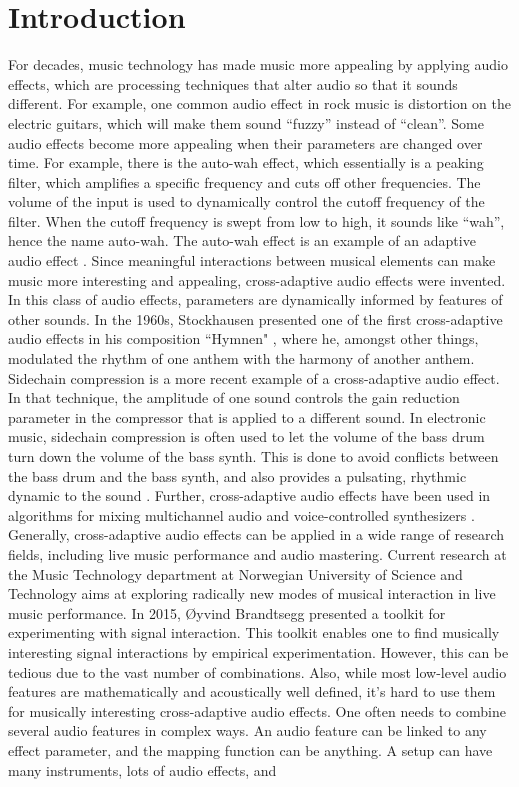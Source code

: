 \chapter{Introduction}
For decades, music technology has made music more appealing by applying audio effects, which are processing techniques that alter audio so that it sounds different. For example, one common audio effect in rock music is distortion on the electric guitars, which will make them sound “fuzzy” instead of “clean”. Some audio effects become more appealing when their parameters are changed over time. For example, there is the auto-wah effect, which essentially is a peaking filter, which amplifies a specific frequency and cuts off other frequencies. The volume of the input is used to dynamically control the cutoff frequency of the filter. When the cutoff frequency is swept from low to high, it sounds like “wah”, hence the name auto-wah. The auto-wah effect is an example of an adaptive audio effect \citep{verfaille2006}. Since meaningful interactions between musical elements can make music more interesting and appealing, cross-adaptive audio effects were invented. In this class of audio effects, parameters are dynamically informed by features of other sounds. In the 1960s, Stockhausen presented one of the first cross-adaptive audio effects in his composition ``Hymnen" \citep{moritz2003}, where he, amongst other things, modulated the rhythm of one anthem with the harmony of another anthem. Sidechain compression is a more recent example of a cross-adaptive audio effect. In that technique, the amplitude of one sound controls the gain reduction parameter in the compressor that is applied to a different sound. In electronic music, sidechain compression is often used to let the volume of the bass drum turn down the volume of the bass synth. This is done to avoid conflicts between the bass drum and the bass synth, and also provides a pulsating, rhythmic dynamic to the sound \citep{colletti2013}. Further, cross-adaptive audio effects have been used in algorithms for mixing multichannel audio \citep{reiss2011} and voice-controlled synthesizers \citep{cartwright2014}. Generally, cross-adaptive audio effects can be applied in a wide range of research fields, including live music performance and audio mastering. Current research at the Music Technology department at Norwegian University of Science and Technology aims at exploring radically new modes of musical interaction in live music performance. In 2015, Øyvind Brandtsegg presented a toolkit for experimenting with signal interaction. This toolkit enables one to find musically interesting signal interactions by empirical experimentation. However, this can be tedious due to the vast number of combinations. Also, while most low-level audio features are mathematically and acoustically well defined, it's hard to use them for musically interesting cross-adaptive audio effects. One often needs to combine several audio features in complex ways. An audio feature can be linked to any effect parameter, and the mapping function can be anything. A setup can have many instruments, lots of audio effects, and 